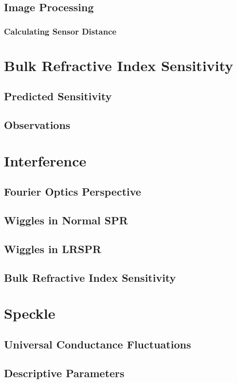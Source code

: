 \documentclass[a4paper,titlepage,onecolumn]{report}
\begin{document}
 \section{Image Processing}
  \subsection{Calculating Sensor Distance}

\chapter{Bulk Refractive Index Sensitivity} \label{ch:bulkri}
 \section{Predicted Sensitivity}
 \section{Observations}

\chapter{Interference} \label{ch:interference}
 \section{Fourier Optics Perspective}
 \section{Wiggles in Normal SPR}
 \section{Wiggles in LRSPR}
 \section{Bulk Refractive Index Sensitivity}

\chapter{Speckle} \label{ch:speckle}
 \section{Universal Conductance Fluctuations}
 \section{Descriptive Parameters}
\end{document}

